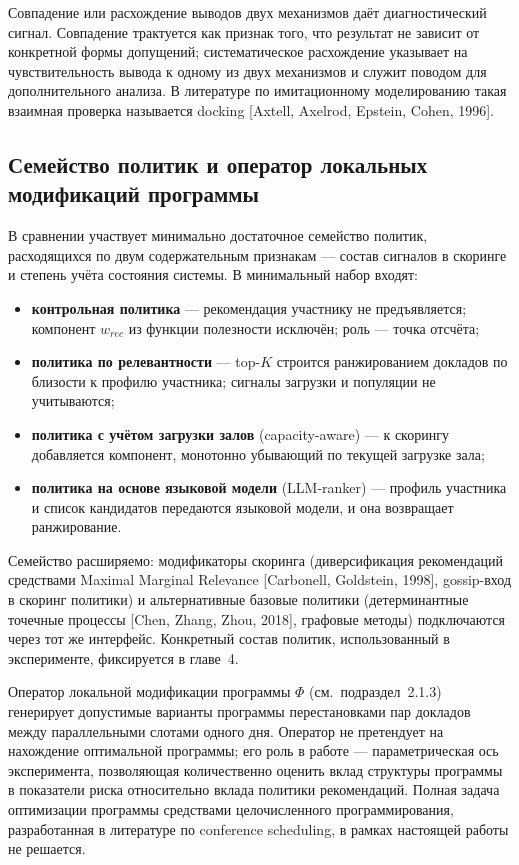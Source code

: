 Совпадение или расхождение выводов двух механизмов даёт диагностический сигнал. Совпадение трактуется как признак того, что результат не зависит от конкретной формы допущений; систематическое расхождение указывает на чувствительность вывода к одному из двух механизмов и служит поводом для дополнительного анализа. В литературе по имитационному моделированию такая взаимная проверка называется docking [Axtell, Axelrod, Epstein, Cohen, 1996].


\subsection{Семейство политик и оператор локальных модификаций программы}

В сравнении участвует минимально достаточное семейство политик, расходящихся по двум содержательным признакам --- состав сигналов в скоринге и степень учёта состояния системы. В минимальный набор входят:

\begin{itemize}
\item \textbf{контрольная политика} --- рекомендация участнику не предъявляется; компонент $w_{rec}$ из функции полезности исключён; роль --- точка отсчёта;
\item \textbf{политика по релевантности} --- top-$K$ строится ранжированием докладов по близости к профилю участника; сигналы загрузки и популяции не учитываются;
\item \textbf{политика с учётом загрузки залов} (capacity-aware) --- к скорингу добавляется компонент, монотонно убывающий по текущей загрузке зала;
\item \textbf{политика на основе языковой модели} (LLM-ranker) --- профиль участника и список кандидатов передаются языковой модели, и она возвращает ранжирование.
\end{itemize}

Семейство расширяемо: модификаторы скоринга (диверсификация рекомендаций средствами Maximal Marginal Relevance [Carbonell, Goldstein, 1998], gossip-вход в скоринг политики) и альтернативные базовые политики (детерминантные точечные процессы [Chen, Zhang, Zhou, 2018], графовые методы) подключаются через тот же интерфейс. Конкретный состав политик, использованный в эксперименте, фиксируется в главе~4.

Оператор локальной модификации программы $\Phi$ (см.~подраздел~2.1.3) генерирует допустимые варианты программы перестановками пар докладов между параллельными слотами одного дня. Оператор не претендует на нахождение оптимальной программы; его роль в работе --- параметрическая ось эксперимента, позволяющая количественно оценить вклад структуры программы в показатели риска относительно вклада политики рекомендаций. Полная задача оптимизации программы средствами целочисленного программирования, разработанная в литературе по conference scheduling, в рамках настоящей работы не решается.


